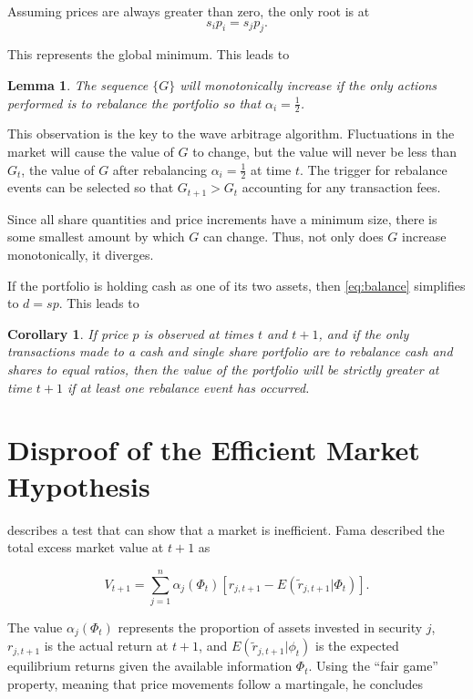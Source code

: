 \documentclass{article}
\newtheorem{corollary}{Corollary}
\newtheorem{lemma}{Lemma}
\begin{document}
Assuming prices are always greater than zero, the only root is at
\begin{equation}
\label{eq:balance}
  s_i p_i = s_j p_j .
\end{equation}

This represents the global minimum. This leads to

\begin{lemma}
\label{lemma}
  The sequence $\{G\}$ will monotonically increase if the only actions performed
  is to rebalance the portfolio so that $\alpha_i = \frac{1}{2}$.
\end{lemma}

This observation is the key to the wave arbitrage algorithm. Fluctuations in the
market will cause the value of $G$ to change, but the value will never be less
than $G_t$, the value of $G$ after rebalancing $\alpha_i = \frac{1}{2}$ at
time $t$. The trigger for rebalance events can be selected so that
$G_{t+1} > G_t$ accounting for any transaction fees.

Since all share quantities and price increments have a minimum size, there is
some smallest amount by which $G$ can change. Thus, not only does $G$ increase
monotonically, it diverges.

If the portfolio is holding cash as one of its two assets, then
\ref{eq:balance} simplifies to $d = s p$. This leads to

\begin{corollary}
  If price $p$ is observed at times $t$ and $t+1$, and if the only
  transactions made to a cash and single share portfolio are to rebalance cash
  and shares to equal ratios, then the value of the portfolio will be strictly
  greater at time $t + 1$ if at least one rebalance event has occurred.
\end{corollary}

\section{Disproof of the Efficient Market Hypothesis}
\label{sec:disproof}

\citet{fama1970} describes a test that can show that a market is
inefficient. Fama described the total excess market value at $t+1$ as

\begin{equation}
  V_{t+1}
    = \sum_{j=1}^n \alpha_j (\Phi_t) [ r_{j,t+1} - E(\tilde{r}_{j,t+1} | \Phi_t)].
\end{equation}

The value $\alpha_j (\Phi_t)$ represents the proportion of assets invested in
security $j$, $r_{j,t+1}$ is the actual return at $t+1$, and
$E(\tilde{r}_{j,t+1} | \phi_t)$ is the expected equilibrium returns given the
available information $\Phi_t$. Using the ``fair game'' property, meaning that
price movements follow a martingale, he concludes
\end{document}
